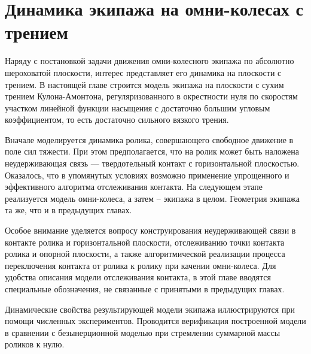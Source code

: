 \chapter{Динамика экипажа на омни-колесах с трением}

Наряду с постановкой задачи движения омни-колесного экипажа по абсолютно шероховатой плоскости,
интерес представляет его динамика на плоскости с трением.
В настоящей главе строится модель экипажа на плоскости с сухим трением Кулона-Амонтона,
регуляризованного в окрестности нуля по скоростям участком линейной функции насыщения с достаточно большим угловым коэффициентом,
то есть достаточно сильного вязкого трения.

Вначале моделируется динамика ролика, совершающего свободное движение в поле сил тяжести.
При этом предполагается, что на ролик может быть наложена неудерживающая связь --- твердотельный контакт с горизонтальной плоскостью. 
Оказалось, что в упомянутых условиях возможно применение упрощенного и эффективного алгоритма отслеживания контакта.
На следующем этапе реализуется модель омни-колеса, а затем -- экипажа в целом.
Геометрия экипажа та же, что и в предыдущих главах.

Особое внимание уделяется вопросу конструирования неудерживающей связи в контакте ролика и горизонтальной плоскости,
отслеживанию точки контакта ролика и опорной плоскости,
а также алгоритмической реализации процесса 
переключения контакта от ролика к ролику при качении омни-колеса.
Для удобства описания модели отслеживания контакта, в этой главе вводятся специальные обозначения, не связанные с принятыми в предыдущих главах.

Динамические свойства результирующей модели экипажа иллюстрируются при помощи численных экспериментов.
Проводится верификация построенной модели в сравнении с безынерционной моделью при стремлении суммарной массы роликов к нулю.
